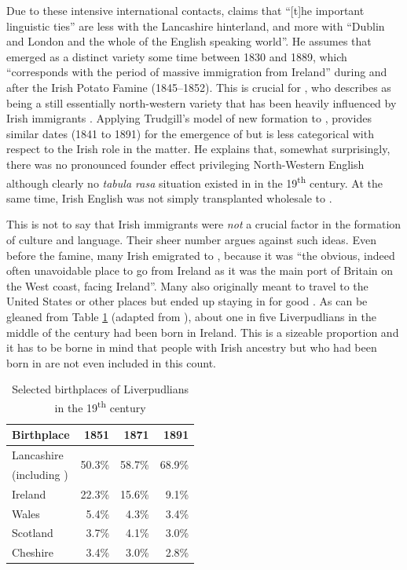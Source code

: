 Due to these intensive international contacts, \citet[15]{knowles1973} claims that ``[t]he important linguistic ties'' are less with the Lancashire hinterland, and more with ``Dublin and London and the whole of the English speaking world''.
He assumes that  emerged as a distinct variety some time between 1830 and 1889, which ``corresponds with the period of massive immigration from Ireland'' \citeyearpar[18]{knowles1973} during and after the Irish Potato Famine (1845--1852).
This is crucial for \citeauthor{knowles1973}, who describes  as being a still essentially north-western variety that has been heavily influenced by Irish immigrants \citeyearpar[cf.][51]{knowles1973}.
Applying Trudgill's model of new  formation \citep{trudgill1986,trudgill2004} to , \citeauthor{honeybone2007} provides similar dates (1841 to 1891) for the emergence of  but is less categorical with respect to the Irish role in the matter.
He explains that, somewhat surprisingly, there was no pronounced founder effect privileging North-Western English although clearly no \emph{tabula rasa} situation existed in  in the 19\textsuperscript{th} century.
At the same time, Irish English was not simply transplanted wholesale to  \citep[cf.][117 and 121]{honeybone2007}.

This is not to say that Irish immigrants were \emph{not} a crucial factor in the formation of  culture and language.
Their sheer number argues against such ideas.
Even before the famine, many Irish emigrated to , because it was ``the obvious, indeed often unavoidable place to go from Ireland as it was the main port of Britain on the West coast, facing Ireland''.
Many also originally meant to travel to the United States or other places but ended up staying in  for good  \citep[cf.][114 and 117]{honeybone2007}.
As can be gleaned from Table \ref{tab.birthplace} (adapted from \cite[249]{pooley2006}), about one in five Liverpudlians in the middle of the century had been born in Ireland.
This is a sizeable proportion and it has to be borne in mind that people with Irish ancestry but who had been born in  are not even included in this count.

	\begin{table}[h]
		\centering
		\caption{Selected birthplaces of Liverpudlians in the 19\textsuperscript{th} century}
		\begin{tabular}{lrrr}
			\hline
			Birthplace & 1851 & 1871 & 1891 \\ 
			\hline
			Lancashire & \multirow{2}{*}{50.3\%} & \multirow{2}{*}{58.7\%} & \multirow{2}{*}{68.9\%} \\
			(including \isi{Liverpool}) & & & \\
			Ireland & 22.3\% & 15.6\% & 9.1\% \\ 
			Wales & 5.4\% & 4.3\% & 3.4\% \\ 
			Scotland & 3.7\% & 4.1\% & 3.0\% \\
			Cheshire & 3.4\% & 3.0\% & 2.8\% \\ 
			\hline
		\end{tabular}
		\label{tab.birthplace}
	\end{table}


